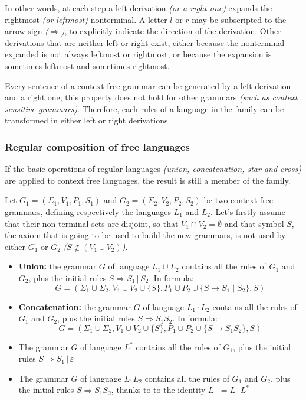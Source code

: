 \documentclass[english]{article}
\begin{document}
\bigskip
In other words, at each step a left derivation \textit{(or a right one)} expands the rightmost \textit{(or leftmost)} nonterminal.
A letter \(l\) or \(r\) may be subscripted to the arrow sign \textit{(\(\Rightarrow\))}, to explicitly indicate the direction of the derivation.
Other derivations that are neither left or right exist, either because the nonterminal expanded is not always leftmost or rightmost, or because the expansion is sometimes leftmost and sometimes rightmost.

Every sentence of a context free grammar can be generated by a left derivation and a right one;
this property does not hold for other grammars \textit{(such as context sensitive grammars)}.
Therefore, each rules of a language in the \CF family can be transformed in either left or right derivations.

\subsubsection{Regular composition of free languages}

If the basic operations of regular languages \textit{(union, concatenation, star and cross)} are applied to context free languages, the result is still a member of the \CF family.

Let \(G_1 = \left(\Sigma_1, V_1, P_1, S_1 \right)\) and \(G_2 = \left(\Sigma_2, V_2, P_2, S_2 \right)\) be two context free grammars, defining respectively the languages \(L_1\) and \(L_2\).
Let's firstly assume that their non terminal sets are disjoint, so that \(V_1 \cap V_2 = \emptyset\) and that symbol \(S\), the axiom that is going to be used to build the new grammars, is not used by either \(G_1\) or \(G_2\) \textit{(\(S \notin (V_1 \cup V_2)\))}.

\begin{itemize}
  \item \textbf{Union:} the grammar \(G\) of language \(L_1 \cup L_2\) contains all the rules of \(G_1\) and \(G_2\), plus the initial rules \(S \Rightarrow S_1 \,|\, S_2 \). In formula:
        \[ G = \left(\Sigma_1 \cup \Sigma_2, V_1 \cup V_2 \cup \{S\}, P_1 \cup P_2 \cup \{S \rightarrow S_1 \mid S_2\}, S \right) \]
  \item \textbf{Concatenation:} the grammar \(G\) of language \(L_1 \cdot L_2\) contains all the rules of \(G_1\) and \(G_2\), plus the initial rules \(S \Rightarrow S_1 S_2\). In formula:
        \[ G = \left(\Sigma_1 \cup \Sigma_2, V_1 \cup V_2 \cup \{S\}, P_1 \cup P_2 \cup \{S \rightarrow S_1 S_2\}, S \right) \]
  \item The grammar \(G\) of language \(L_1^\ast\) contains all the rules of \(G_1\), plus the initial rules \(S \Rightarrow S_1 \,|\, \varepsilon\)
  \item The grammar \(G\) of language \(L_1  L_2\) contains all the rules of \(G_1\) and \(G_2\), plus the initial rules \(S \Rightarrow S_1 S_2\), thanks to to the identity \(L^+ = L \cdot L^\ast\)
\end{itemize}
\end{document}
